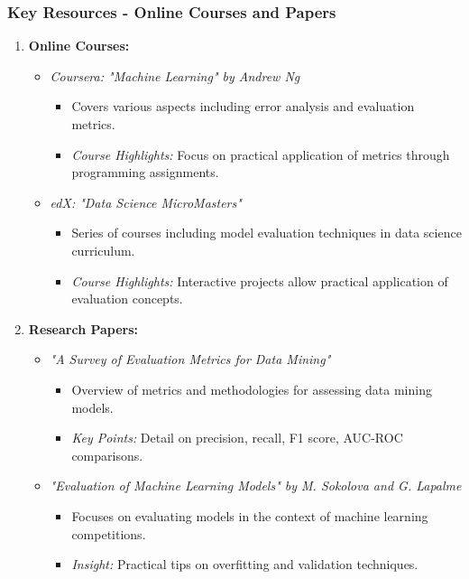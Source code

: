 \documentclass[aspectratio=169]{beamer}
\begin{document}
\begin{frame}[fragile]
    \frametitle{Key Resources - Online Courses and Papers}
    \begin{enumerate}
        \item \textbf{Online Courses:}
        \begin{itemize}
            \item \textit{Coursera: "Machine Learning" by Andrew Ng}
            \begin{itemize}
                \item Covers various aspects including error analysis and evaluation metrics.
                \item \textit{Course Highlights:} Focus on practical application of metrics through programming assignments.
            \end{itemize}
            
            \item \textit{edX: "Data Science MicroMasters"}
            \begin{itemize}
                \item Series of courses including model evaluation techniques in data science curriculum.
                \item \textit{Course Highlights:} Interactive projects allow practical application of evaluation concepts.
            \end{itemize}
        \end{itemize}

        \item \textbf{Research Papers:}
        \begin{itemize}
            \item \textit{"A Survey of Evaluation Metrics for Data Mining"}
            \begin{itemize}
                \item Overview of metrics and methodologies for assessing data mining models.
                \item \textit{Key Points:} Detail on precision, recall, F1 score, AUC-ROC comparisons.
            \end{itemize}
            
            \item \textit{"Evaluation of Machine Learning Models" by M. Sokolova and G. Lapalme}
            \begin{itemize}
                \item Focuses on evaluating models in the context of machine learning competitions.
                \item \textit{Insight:} Practical tips on overfitting and validation techniques.
            \end{itemize}
        \end{itemize}
    \end{enumerate}
\end{frame}
\end{document}
